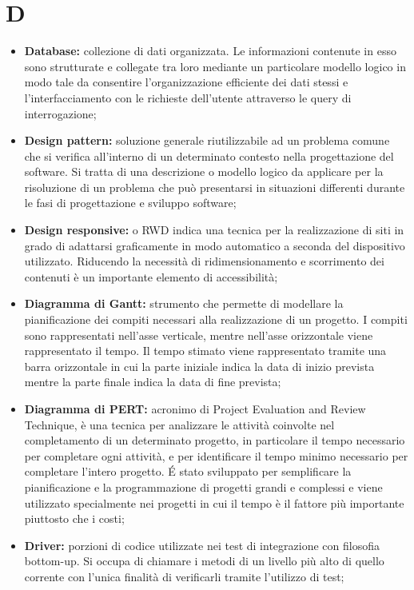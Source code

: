 \section*{\Huge D} %
\label{sec:d}
	\begin{itemize}
		\item \textbf{Database:} collezione di dati organizzata. Le informazioni contenute in esso sono strutturate e collegate tra loro mediante un particolare modello logico in modo tale da consentire l'organizzazione efficiente dei dati stessi e l'interfacciamento con le richieste dell'utente attraverso le query di interrogazione;
		\item \textbf{Design pattern:} soluzione generale riutilizzabile ad un problema comune che si verifica all'interno di un determinato contesto nella progettazione del software. Si tratta di una descrizione o modello logico da applicare per la risoluzione di un problema che può presentarsi in situazioni differenti durante le fasi di progettazione e sviluppo software;
		\item \textbf{Design responsive:} o RWD indica una tecnica per la realizzazione di siti in grado di adattarsi graficamente in modo automatico a seconda del dispositivo utilizzato. Riducendo la necessità di ridimensionamento e scorrimento dei contenuti è un importante elemento di accessibilità;
		\item \textbf{Diagramma di Gantt:} strumento che permette di modellare la pianificazione dei compiti necessari alla realizzazione di un progetto. I compiti sono rappresentati nell'asse verticale, mentre nell'asse orizzontale viene rappresentato il tempo. Il tempo stimato viene rappresentato tramite una barra orizzontale in cui la parte iniziale indica la data di inizio prevista mentre la parte finale indica la data di fine prevista;
		\item \textbf{Diagramma di PERT:} acronimo di Project Evaluation and Review Technique, è una tecnica per analizzare le attività coinvolte nel completamento di un determinato progetto, in particolare il tempo necessario per completare ogni attività, e per identificare il tempo minimo necessario per completare l'intero progetto. É stato sviluppato per semplificare la pianificazione e la programmazione di progetti grandi e complessi e viene utilizzato specialmente nei progetti in cui il tempo è il fattore più importante piuttosto che i costi;
		\item \textbf{Driver:} porzioni di codice utilizzate nei test di integrazione con filosofia bottom-up. Si occupa di chiamare i metodi di un livello più alto di quello corrente con l'unica finalità di verificarli tramite l'utilizzo di test;
	\end{itemize}
\pagebreak

